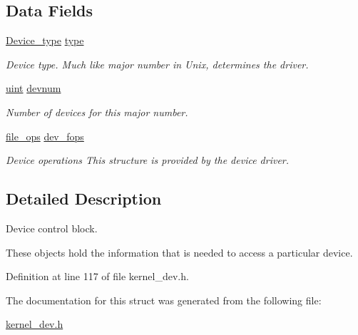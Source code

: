 \subsection*{Data Fields}
\begin{DoxyCompactItemize}
\item 
\hyperlink{group__dev_ga879ceac20e83b2375e5b49f4379b0c90}{Device\+\_\+type} \hyperlink{structdevice__control__block_a35a45268132777177a33513c747633c4}{type}\hypertarget{structdevice__control__block_a35a45268132777177a33513c747633c4}{}\label{structdevice__control__block_a35a45268132777177a33513c747633c4}

\begin{DoxyCompactList}\small\item\em Device type. Much like \textquotesingle{}major number\textquotesingle{} in Unix, determines the driver. \end{DoxyCompactList}\item 
\hyperlink{bios_8h_a91ad9478d81a7aaf2593e8d9c3d06a14}{uint} \hyperlink{structdevice__control__block_a25d8f038a1c6d41f445d078276117fba}{devnum}\hypertarget{structdevice__control__block_a25d8f038a1c6d41f445d078276117fba}{}\label{structdevice__control__block_a25d8f038a1c6d41f445d078276117fba}

\begin{DoxyCompactList}\small\item\em Number of devices for this major number. \end{DoxyCompactList}\item 
\hyperlink{group__dev_gaab625d8ae3a95e942ed10ed1579f5042}{file\+\_\+ops} \hyperlink{structdevice__control__block_a2945d5da96f40ff7fae94e295624a7c7}{dev\+\_\+fops}\hypertarget{structdevice__control__block_a2945d5da96f40ff7fae94e295624a7c7}{}\label{structdevice__control__block_a2945d5da96f40ff7fae94e295624a7c7}

\begin{DoxyCompactList}\small\item\em Device operations This structure is provided by the device driver. \end{DoxyCompactList}\end{DoxyCompactItemize}


\subsection{Detailed Description}
Device control block. 

These objects hold the information that is needed to access a particular device. 

Definition at line 117 of file kernel\+\_\+dev.\+h.



The documentation for this struct was generated from the following file\+:\begin{DoxyCompactItemize}
\item 
\hyperlink{kernel__dev_8h}{kernel\+\_\+dev.\+h}\end{DoxyCompactItemize}
